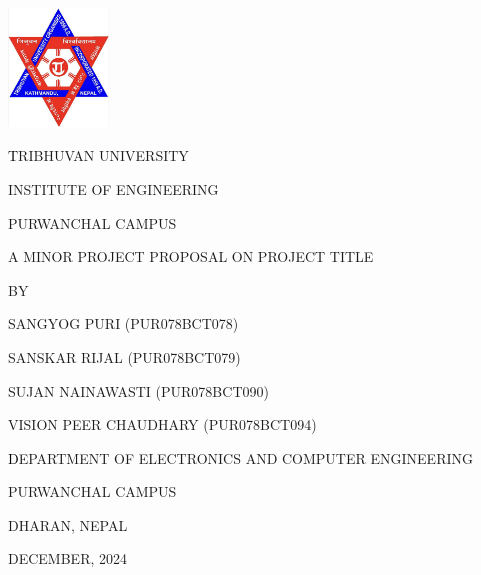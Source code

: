 \begin{titlepage}
    \centering
    
    \includegraphics[width=0.2\textwidth]{Graphics/TULogo.png}\par
    \vspace{1.2cm}
    {\fontsize{14pt}{12pt}\selectfont\textcolor{black}
    TRIBHUVAN UNIVERSITY \par INSTITUTE OF ENGINEERING \par PURWANCHAL CAMPUS \par
    \vspace{1.2cm}
    \begin{flushleft}
    
    \end{flushleft}

    \par A MINOR PROJECT PROPOSAL ON PROJECT TITLE \par

    \vspace{1.2cm}
    BY\par SANGYOG PURI (PUR078BCT078)
      \par SANSKAR RIJAL (PUR078BCT079)
      \par SUJAN NAINAWASTI (PUR078BCT090)
      \par VISION PEER CHAUDHARY (PUR078BCT094)
    \par
    \vspace{1.2cm}\par
    }
    {\fontsize{13pt}{12pt}\selectfont\textcolor{black}
    DEPARTMENT OF ELECTRONICS AND COMPUTER ENGINEERING\par PURWANCHAL CAMPUS\par DHARAN, NEPAL\par
    \vspace{1.2cm}
    \vspace{1.2cm}
    
    DECEMBER, 2024 
    }
\end{titlepage}

